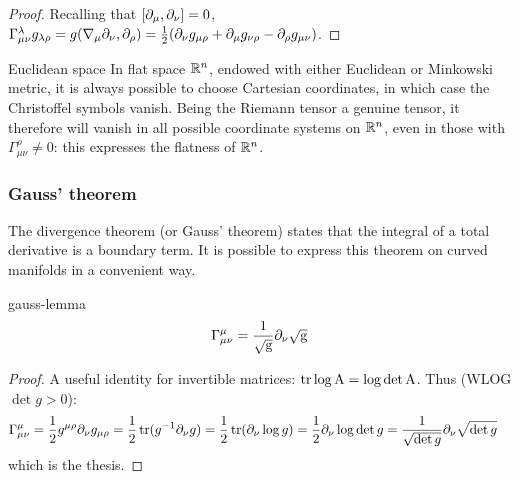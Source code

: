 \begin{proofbox}
  \begin{proof}
    Recalling that $ [\partial_\mu, \partial_\nu] = 0 $, $ \Gamma^\lambda_{\mu \nu} g_{\lambda \rho} = g(\nabla_\mu \partial_\nu, \partial_\rho) = \frac{1}{2} (\partial_\nu g_{\mu \rho} + \partial_\mu g_{\nu \rho} - \partial_\rho g_{\mu \nu}) $.
  \end{proof}
\end{proofbox}

\begin{example}{Euclidean space}{}
  In flat space $ \mathbb{R}^n $, endowed with either Euclidean or Minkowski metric, it is always possible to choose Cartesian coordinates, in which case the Christoffel symbols vanish. Being the Riemann tensor a genuine tensor, it therefore will vanish in all possible coordinate systems on $ \mathbb{R}^n $, even in those with $ \Gamma^\rho_{\mu \nu} \neq 0 $: this expresses the flatness of $ \mathbb{R}^n $.
\end{example}

\subsubsection{Gauss' theorem}

The divergence theorem (or Gauss' theorem) states that the integral of a total derivative is a boundary term. It is possible to express this theorem on curved manifolds in a convenient way.

\begin{lemma}[before upper = {\tcbtitle}]{}{gauss-lemma}
  \begin{equation}
    \Gamma^\mu_{\mu \nu} = \frac{1}{\sqrt{\mathrm{g}}} \partial_\nu \sqrt{\mathrm{g}}
  \end{equation}
\end{lemma}

\begin{proofbox}
  \begin{proof}
    A useful identity for invertible matrices: $ \operatorname{tr} \log \mathrm{A} = \log \det \mathrm{A} $. Thus (WLOG $ \det g > 0 $):
    \begin{equation*}
      \begin{split}
        \Gamma^\mu_{\mu \nu}
        &= \frac{1}{2} g^{\mu \rho} \partial_\nu g_{\mu \rho} = \frac{1}{2} \operatorname{tr} (g^{-1} \partial_\nu g) = \frac{1}{2} \operatorname{tr} (\partial_\nu \log g) = \frac{1}{2} \partial_\nu \log \det g = \frac{1}{\sqrt{\det g}} \partial_\nu \sqrt{\det g}
      \end{split}
    \end{equation*}
    which is the thesis.
  \end{proof}
\end{proofbox}

